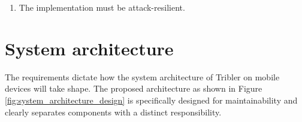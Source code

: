 \begin{enumerate}[label=B\arabic*.,ref=B\arabic*]
	\item \label{rq:AttackResilient} The implementation must be attack-resilient.
	
\end{enumerate}




\section{System architecture}
The requirements dictate how the system architecture of Tribler on mobile devices will take shape.
The proposed architecture as shown in Figure \ref{fig:system_architecture_design} is specifically designed for maintainability and clearly separates components with a distinct responsibility.

